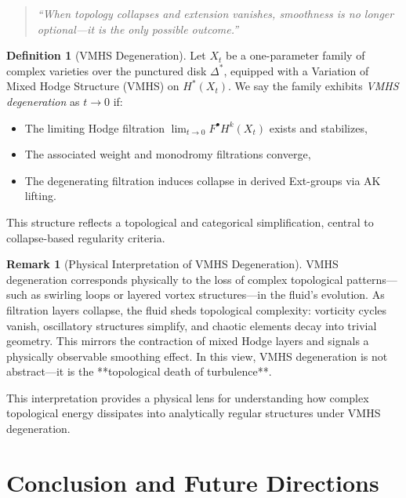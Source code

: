 \documentclass[11pt]{article}
\theoremstyle{definition}
\newtheorem{definition}[theorem]{Definition}
\newtheorem{remark}[theorem]{Remark}
\begin{document}
\begin{quote}
\textit{“When topology collapses and extension vanishes, smoothness is no longer optional—it is the only possible outcome.”}
\end{quote}

\begin{definition}[VMHS Degeneration] \label{def:vmhs-collapse}
Let $X_t$ be a one-parameter family of complex varieties over the punctured disk $\Delta^*$, equipped with a Variation of Mixed Hodge Structure (VMHS) on $H^*(X_t)$.  
We say the family exhibits \emph{VMHS degeneration} as $t \to 0$ if:
\begin{itemize}
  \item The limiting Hodge filtration $\lim_{t \to 0} F^\bullet H^k(X_t)$ exists and stabilizes,
  \item The associated weight and monodromy filtrations converge,
  \item The degenerating filtration induces collapse in derived Ext-groups via AK lifting.
\end{itemize}
This structure reflects a topological and categorical simplification, central to collapse-based regularity criteria.
\end{definition}

\begin{remark}[Physical Interpretation of VMHS Degeneration]
VMHS degeneration corresponds physically to the loss of complex topological patterns—such as swirling loops or layered vortex structures—in the fluid’s evolution.  
As filtration layers collapse, the fluid sheds topological complexity:  
vorticity cycles vanish, oscillatory structures simplify, and chaotic elements decay into trivial geometry.  
This mirrors the contraction of mixed Hodge layers and signals a physically observable smoothing effect.  
In this view, VMHS degeneration is not abstract—it is the **topological death of turbulence**.
\end{remark}

This interpretation provides a physical lens for understanding how complex topological energy dissipates into analytically regular structures under VMHS degeneration.


\section*{Conclusion and Future Directions}
\end{document}
